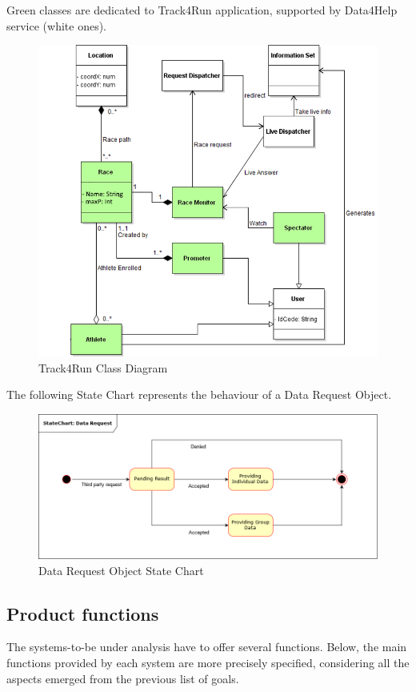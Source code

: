 \begin{minipage}{\textwidth}
{\color{LimeGreen} Green classes} are dedicated to {\color{LimeGreen} Track4Run} application, supported by Data4Help service (white ones).
\begin{figure}[H]
\centering
\includegraphics[scale=0.7]{Images/Class_Track4Run.png}
\caption{Track4Run Class Diagram}
\end{figure}
The following State Chart represents the behaviour of a Data Request Object.
\begin{figure}[H]
\centering
\includegraphics[scale=0.5]{Images/StateChart.png}
\caption{Data Request Object State Chart}
\end{figure}
\end{minipage}

\subsection{Product functions}
The systems-to-be under analysis have to offer several functions. Below, the main functions provided by each system are more precisely specified, considering all the aspects emerged from the previous list of goals.
